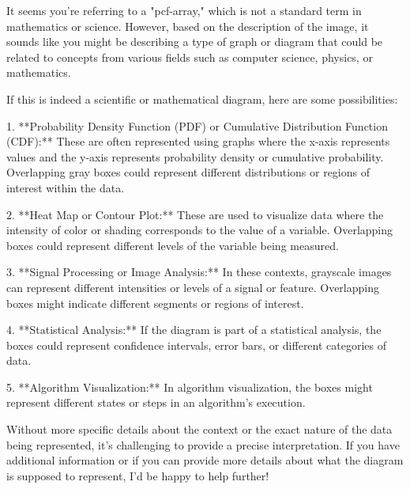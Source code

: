It seems you're referring to a "pcf-array," which is not a standard term in mathematics or science. However, based on the description of the image, it sounds like you might be describing a type of graph or diagram that could be related to concepts from various fields such as computer science, physics, or mathematics.

If this is indeed a scientific or mathematical diagram, here are some possibilities:

1. **Probability Density Function (PDF) or Cumulative Distribution Function (CDF):** These are often represented using graphs where the x-axis represents values and the y-axis represents probability density or cumulative probability. Overlapping gray boxes could represent different distributions or regions of interest within the data.

2. **Heat Map or Contour Plot:** These are used to visualize data where the intensity of color or shading corresponds to the value of a variable. Overlapping boxes could represent different levels of the variable being measured.

3. **Signal Processing or Image Analysis:** In these contexts, grayscale images can represent different intensities or levels of a signal or feature. Overlapping boxes might indicate different segments or regions of interest.

4. **Statistical Analysis:** If the diagram is part of a statistical analysis, the boxes could represent confidence intervals, error bars, or different categories of data.

5. **Algorithm Visualization:** In algorithm visualization, the boxes might represent different states or steps in an algorithm's execution.

Without more specific details about the context or the exact nature of the data being represented, it's challenging to provide a precise interpretation. If you have additional information or if you can provide more details about what the diagram is supposed to represent, I'd be happy to help further!